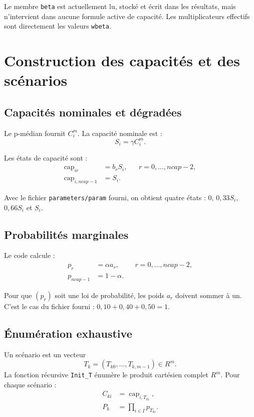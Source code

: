 \documentclass[11pt,a4paper]{article}
\newcommand{\code}[1]{\texttt{#1}}
\begin{document}
Le membre \code{beta} est actuellement lu, stocké et écrit dans les résultats,
mais n'intervient dans aucune formule active de capacité. Les multiplicateurs
effectifs sont directement les valeurs \code{wbeta}.

\section{Construction des capacités et des scénarios}

\subsection{Capacités nominales et dégradées}

Le p-médian fournit $C^m_i$. La capacité nominale est :
\begin{equation}
S_i=\gamma C^m_i.
\end{equation}

Les états de capacité sont :
\begin{align}
\operatorname{cap}_{ir} &= b_r S_i,
  &&r=0,\dots,ncap-2,\\
\operatorname{cap}_{i,ncap-1} &= S_i.
\end{align}

Avec le fichier \code{parameters/param} fourni, on obtient quatre états :
$0$, $0{,}33S_i$, $0{,}66S_i$ et $S_i$.

\subsection{Probabilités marginales}

Le code calcule :
\begin{align}
p_r &= \alpha a_r,
  &&r=0,\dots,ncap-2,\\
p_{ncap-1} &= 1-\alpha.
\end{align}

Pour que $(p_r)$ soit une loi de probabilité, les poids $a_r$ doivent sommer
à un. C'est le cas du fichier fourni :
$0{,}10+0{,}40+0{,}50=1$.

\subsection{Énumération exhaustive}

Un scénario est un vecteur
\[
T_k=(T_{k0},\dots,T_{k,m-1})\in R^m.
\]
La fonction récursive \code{Init\_T} énumère le produit cartésien complet
$R^m$. Pour chaque scénario :
\begin{align}
C_{ki} &= \operatorname{cap}_{i,T_{ki}},\\
P_k &= \prod_{i\in I}p_{T_{ki}}.
\end{align}
\end{document}
